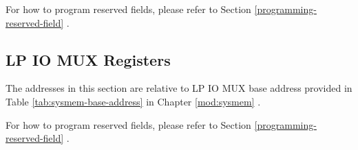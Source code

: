 \documentclass[main\_\_EN.tex]{subfiles}
\begin{document}
For how to program reserved fields, please refer to Section \ref{programming-reserved-field} \textit{}.



\subsection{LP IO MUX Registers}

The addresses in this section are relative to LP IO MUX base address provided in Table \ref{tab:sysmem-base-address} in Chapter \ref{mod:sysmem} \textit{}.

For how to program reserved fields, please refer to Section \ref{programming-reserved-field} \textit{}.


\end{document}
